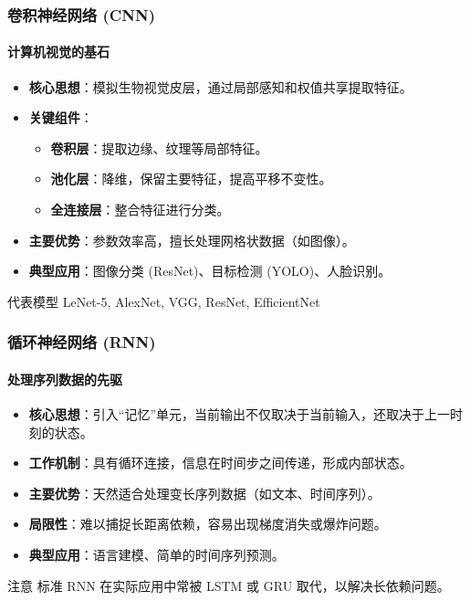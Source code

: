\documentclass[12pt, t, aspectratio=169]{beamer}
\begin{document}
\begin{frame}
    \frametitle{卷积神经网络 (CNN)}
    \framesubtitle{计算机视觉的基石}
    
    \begin{itemize}
        \item \textbf{核心思想}：模拟生物视觉皮层，通过局部感知和权值共享提取特征。
        \item \textbf{关键组件}：
        \begin{itemize}
            \item \textbf{卷积层}：提取边缘、纹理等局部特征。
            \item \textbf{池化层}：降维，保留主要特征，提高平移不变性。
            \item \textbf{全连接层}：整合特征进行分类。
        \end{itemize}
        \item \textbf{主要优势}：参数效率高，擅长处理网格状数据（如图像）。
        \item \textbf{典型应用}：图像分类 (ResNet)、目标检测 (YOLO)、人脸识别。
    \end{itemize}
    
    \begin{block}{代表模型}
        LeNet-5, AlexNet, VGG, ResNet, EfficientNet
    \end{block}
\end{frame}

\begin{frame}
    \frametitle{循环神经网络 (RNN)}
    \framesubtitle{处理序列数据的先驱}
    
    \begin{itemize}
        \item \textbf{核心思想}：引入“记忆”单元，当前输出不仅取决于当前输入，还取决于上一时刻的状态。
        \item \textbf{工作机制}：具有循环连接，信息在时间步之间传递，形成内部状态。
        \item \textbf{主要优势}：天然适合处理变长序列数据（如文本、时间序列）。
        \item \textbf{局限性}：难以捕捉长距离依赖，容易出现梯度消失或爆炸问题。
        \item \textbf{典型应用}：语言建模、简单的时间序列预测。
    \end{itemize}
    
    \begin{alertblock}{注意}
        标准 RNN 在实际应用中常被 LSTM 或 GRU 取代，以解决长依赖问题。
    \end{alertblock}
\end{frame}
\end{document}
